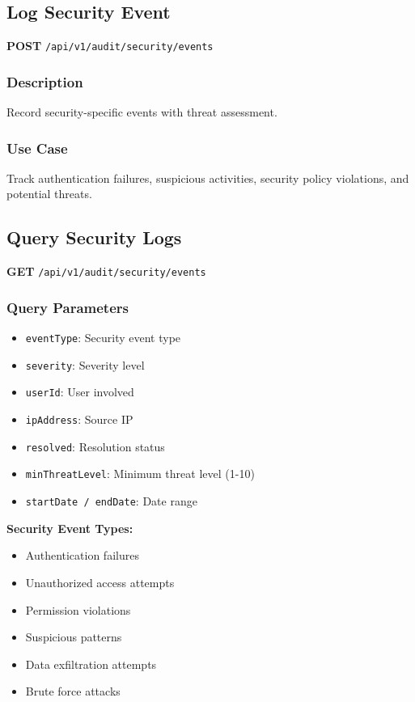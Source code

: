 \documentclass[11pt,a4paper]{report}
\begin{document}
\subsection{Log Security Event}

\textbf{POST} \texttt{/api/v1/audit/security/events}

\subsubsection{Description}
Record security-specific events with threat assessment.

\subsubsection{Use Case}
Track authentication failures, suspicious activities, security policy violations, and potential threats.

\subsection{Query Security Logs}

\textbf{GET} \texttt{/api/v1/audit/security/events}

\subsubsection{Query Parameters}
\begin{itemize}[leftmargin=*]
    \item \texttt{eventType}: Security event type
    \item \texttt{severity}: Severity level
    \item \texttt{userId}: User involved
    \item \texttt{ipAddress}: Source IP
    \item \texttt{resolved}: Resolution status
    \item \texttt{minThreatLevel}: Minimum threat level (1-10)
    \item \texttt{startDate / endDate}: Date range
\end{itemize}

\begin{infobox}
\textbf{Security Event Types:}
\begin{itemize}[leftmargin=*]
    \item Authentication failures
    \item Unauthorized access attempts
    \item Permission violations
    \item Suspicious patterns
    \item Data exfiltration attempts
    \item Brute force attacks
\end{itemize}
\end{infobox}
\end{document}
